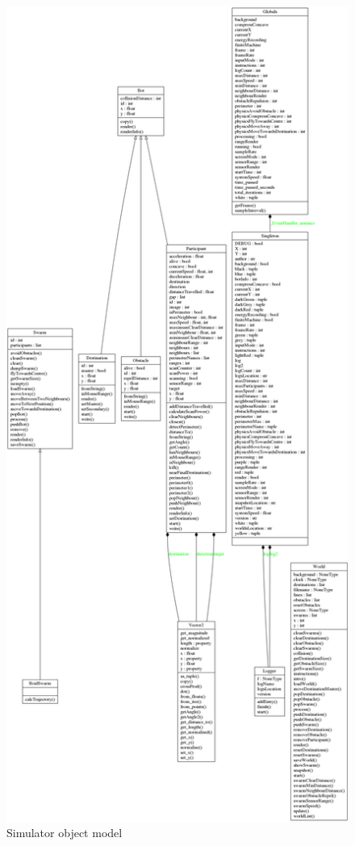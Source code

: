 \begin{figure}[H]
\begin{center}
\includegraphics[width=13cm]{CHAPTER-3/figures/classes_World}
\end{center}
\caption[Simulator object model]{Simulator object model}\label{sim:objectModel}
\end{figure}


